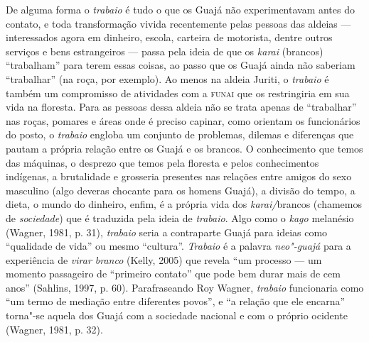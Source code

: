 De alguma forma o \emph{trabaio} é tudo o que os Guajá não
experimentavam antes do contato, e toda transformação vivida
recentemente pelas pessoas das aldeias --- interessados agora em dinheiro,
escola, carteira de motorista, dentre outros serviços e bens
estrangeiros --- passa pela ideia de que os \emph{karai} (brancos)
``trabalham'' para terem essas coisas, ao passo que os Guajá ainda não
saberiam ``trabalhar'' (na roça, por exemplo). Ao menos na aldeia
Juriti, o \emph{trabaio} é também um compromisso de atividades com a
\textsc{funai} que os restringiria em sua vida na floresta. Para as pessoas dessa
aldeia não se trata apenas de ``trabalhar'' nas roças, pomares e áreas
onde é preciso capinar, como orientam os funcionários do posto, o
\emph{trabaio} engloba um conjunto de problemas, dilemas e diferenças
que pautam a própria relação entre os Guajá e os brancos. O conhecimento
que temos das máquinas, o desprezo que temos pela floresta e pelos
conhecimentos indígenas, a brutalidade e grosseria presentes nas
relações entre amigos do sexo masculino (algo deveras chocante para os
homens Guajá), a divisão do tempo, a dieta, o mundo do dinheiro, enfim,
é a própria vida dos \emph{karai/}brancos (chamemos de \emph{sociedade})
que é traduzida pela ideia de \emph{trabaio}. Algo como o \emph{kago}
melanésio (Wagner, 1981, p. 31), \emph{trabaio} seria a contraparte Guajá
para ideias como ``qualidade de vida'' ou mesmo ``cultura''.
\emph{Trabaio} é a palavra \emph{neo"-guajá} para a experiência de
\emph{virar branco} (Kelly, 2005) que revela ``um processo --- um momento
passageiro de ``primeiro contato'' que pode bem durar mais de cem anos''
(Sahlins, 1997, p. 60). Parafraseando Roy Wagner, \emph{trabaio}
funcionaria como ``um termo de mediação entre diferentes povos'', e ``a
relação que ele encarna'' torna"-se aquela dos Guajá com a sociedade
nacional e com o próprio ocidente (Wagner, 1981, p. 32).
